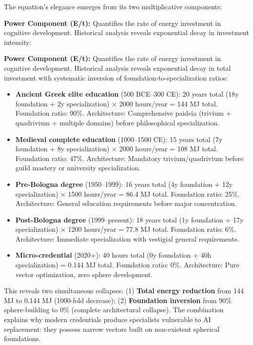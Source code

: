The equation's elegance emerges from its two multiplicative components:

\textbf{Power Component (E/t):} Quantifies the rate of energy investment in cognitive development. Historical analysis reveals exponential decay in investment intensity:

\textbf{Power Component (E/t):} Quantifies the rate of energy investment in cognitive development. Historical analysis reveals exponential decay in total investment with systematic inversion of foundation-to-specialization ratios:

\begin{itemize}
\item \textbf{Ancient Greek elite education} (500 BCE--300 CE): 20 years total (18y foundation + 2y specialization) $\times$ 2000 hours/year = 144 MJ total. Foundation ratio: 90\%. Architecture: Comprehensive paideia (trivium + quadrivium + multiple domains) before philosophical specialization.

\item \textbf{Medieval complete education} (1000--1500 CE): 15 years total (7y foundation + 8y specialization) $\times$ 2000 hours/year = 108 MJ total. Foundation ratio: 47\%. Architecture: Mandatory trivium/quadrivium before guild mastery or university specialization.

\item \textbf{Pre-Bologna degree} (1950--1999): 16 years total (4y foundation + 12y specialization) $\times$ 1500 hours/year = 86.4 MJ total. Foundation ratio: 25\%. Architecture: General education requirements before major concentration.

\item \textbf{Post-Bologna degree} (1999--present): 18 years total (1y foundation + 17y specialization) $\times$ 1200 hours/year = 77.8 MJ total. Foundation ratio: 6\%. Architecture: Immediate specialization with vestigial general requirements.

\item \textbf{Micro-credential} (2020+): 40 hours total (0y foundation + 40h specialization) = 0.144 MJ total. Foundation ratio: 0\%. Architecture: Pure vector optimization, zero sphere development.
\end{itemize}

This reveals two simultaneous collapses: (1) \textbf{Total energy reduction} from 144 MJ to 0.144 MJ (1000-fold decrease); (2) \textbf{Foundation inversion} from 90\% sphere-building to 0\% (complete architectural collapse). The combination explains why modern credentials produce specialists vulnerable to AI replacement: they possess narrow vectors built on non-existent spherical foundations.

